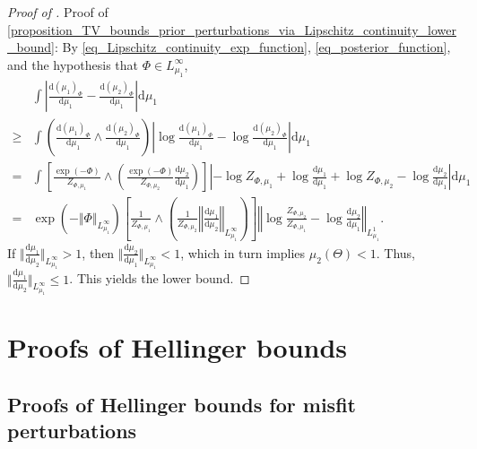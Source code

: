 \documentclass[a4paper]{scrartcl}
\theoremstyle{definition}
\numberwithin{equation}{section}
\newcommand{\rd}{\mathrm{d}}
\newcommand{\Abs}[1]{\left\vert#1\right\vert}
\newcommand{\norm}[1]{\Vert #1 \Vert}
\newcommand{\Norm}[1]{\left\Vert #1 \right\Vert}
\begin{document}
\begin{proof}[Proof of ]
Proof of \cref{proposition_TV_bounds_prior_perturbations_via_Lipschitz_continuity_lower_bound}: By \eqref{eq_Lipschitz_continuity_exp_function}, \eqref{eq_posterior_function}, and the hypothesis that $\Phi\in L^\infty_{\mu_1}$,
\begin{align*}
&\int\Abs{\frac{\rd (\mu_1)_\Phi}{\rd \mu_1}-\frac{\rd (\mu_2)_\Phi}{\rd \mu_1}} \rd \mu_1 
  \\
  \geq & \int \left(\frac{\rd (\mu_1)_\Phi}{\rd \mu_1}\wedge \frac{\rd (\mu_2)_\Phi}{\rd \mu_1} \right)\Abs{\log \frac{\rd (\mu_1)_\Phi}{\rd \mu_1}-\log\frac{\rd (\mu_2)_\Phi}{\rd \mu_1}} \rd \mu_1 
  \\
  =& \int \left[\frac{\exp(-\Phi)}{Z_{\Phi,\mu_1}}\wedge \left(\frac{\exp(-\Phi)}{Z_{\Phi,\mu_2}}\frac{\rd\mu_2}{\rd \mu_1} \right)\right]\Abs{-\log Z_{\Phi,\mu_1}+\log\frac{\rd \mu_1}{\rd \mu_1}+\log Z_{\Phi,\mu_2}-\log\frac{\rd \mu_2}{\rd \mu_1}} \rd \mu_1 
  \\
  =& \exp(-\norm{\Phi}_{L^\infty_{\mu_1}}) \left[\frac{1}{Z_{\Phi,\mu_1}}\wedge \left(\frac{1}{Z_{\Phi,\mu_2}}\Norm{\frac{\rd\mu_1}{\rd \mu_2}}_{L^\infty_{\mu_1}} \right)\right]\Norm{\log \frac{Z_{\Phi,\mu_2}}{Z_{\Phi,\mu_1}}-\log\frac{\rd \mu_2}{\rd \mu_1} }_{L^1_{\mu_1}}.
\end{align*}
If $\norm{\frac{\rd\mu_1}{\rd \mu_2}}_{L^\infty_{\mu_1}}>1$, then $\norm{\tfrac{\rd\mu_2}{\rd\mu_1}}_{L^\infty_{\mu_1}}<1$, which in turn implies $\mu_2(\Theta)<1$. 
Thus, $\norm{\frac{\rd\mu_1}{\rd \mu_2}}_{L^\infty_{\mu_1}}\leq 1$.
This yields the lower bound.
\end{proof}


\section{Proofs of Hellinger bounds}
\label{section_Hellingerbounds_proofs}

\subsection{Proofs of Hellinger bounds for misfit perturbations}
\label{section_Hellingerbounds_Misfitperturbations_proofs}
\end{document}
